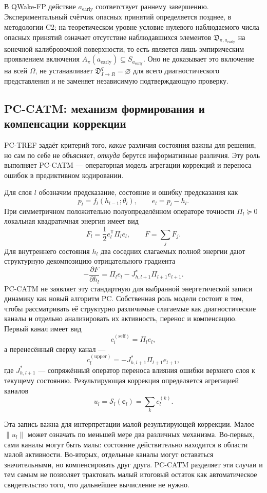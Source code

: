 В QWake-FP действие $a_{\mathrm{early}}$ соответствует раннему завершению.
Экспериментальный счётчик опасных принятий определяется позднее, в методологии
C2; на теоретическом уровне условие нулевого наблюдаемого числа опасных принятий
означает отсутствие наблюдавшихся элементов
$\mathfrak D_{\pi,a_{\mathrm{early}}}$ на конечной калибровочной поверхности,
то есть является лишь эмпирическим проявлением включения
$A_{\pi}(a_{\mathrm{early}})\subseteq S_{a_{\mathrm{early}}}$. Оно не
доказывает это включение на всей $\Omega$, не устанавливает
$\mathfrak D_{I\to R}^{q}=\varnothing$ для всего диагностического
представления и не заменяет независимую подтверждающую проверку.

\subsection{PC-CATM: механизм формирования и компенсации коррекции}
\label{sec:theory-pc-catm}

PC-TREF задаёт критерий того, \emph{какие} различия состояния важны для
решения, но сам по себе не объясняет, \emph{откуда} берутся информативные
различия. Эту роль выполняет PC-CATM --- операторная модель агрегации коррекций
и переноса ошибок в предиктивном кодировании.

Для слоя $l$ обозначим предсказание, состояние и ошибку предсказания как
\[
  p_l=f_l(h_{l-1};\theta_l),
  \qquad
  e_l=p_l-h_l.
\]
При симметричном положительно полуопределённом операторе точности
$\Pi_l\succeq 0$ локальная квадратичная энергия имеет вид
\[
  F_l=\frac12 e_l^{\mathsf T}\Pi_l e_l,
  \qquad F=\sum_j F_j.
\]
Для внутреннего состояния $h_l$ два соседних слагаемых полной энергии дают
структурную декомпозицию отрицательного градиента
\[
  -\frac{\partial F}{\partial h_l}
  =\Pi_l e_l-J_{h,l+1}^{*}\Pi_{l+1}e_{l+1}.
\]
PC-CATM не заявляет эту стандартную для выбранной энергетической записи
динамику как новый алгоритм PC. Собственная роль модели состоит в том, чтобы
рассматривать её структурно различимые слагаемые как диагностические каналы и
отдельно анализировать их активность, перенос и компенсацию. Первый канал имеет
вид
\[
  c_l^{(\mathrm{self})}=\Pi_l e_l,
\]
а перенесённый сверху канал ---
\[
  c_l^{(\mathrm{upper})}
  =-J_{h,l+1}^{*}\Pi_{l+1}e_{l+1},
\]
где $J_{h,l+1}^{*}$ --- сопряжённый оператор переноса влияния ошибки верхнего
слоя к текущему состоянию. Результирующая коррекция определяется агрегацией
каналов
\[
  u_l=\mathcal S_l(\mathbf c_l)=\sum_k c_l^{(k)}.
\]

Эта запись важна для интерпретации малой результирующей коррекции. Малое
$\|u_l\|$ может означать по меньшей мере два различных механизма. Во-первых,
сами каналы могут быть малы: состояние действительно находится в области
малой активности. Во-вторых, отдельные каналы могут оставаться значительными,
но компенсировать друг друга. PC-CATM разделяет эти случаи и тем самым не
позволяет трактовать малый итоговый остаток как автоматическое свидетельство
того, что дальнейшее вычисление не нужно.

